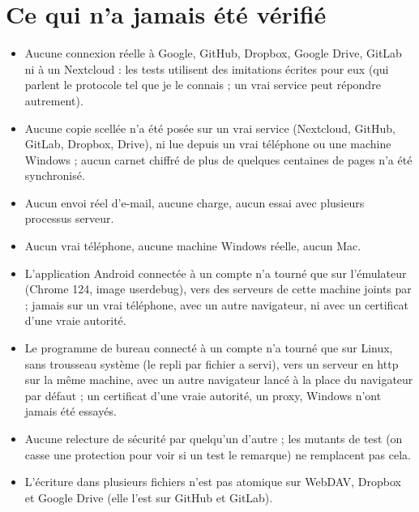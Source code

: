 \documentclass[10pt,a4paper]{article}
\newcommand{\code}[1]{\texttt{\detokenize{#1}}}
\begin{document}
\section{Ce qui n'a jamais été vérifié}\label{sec:nonverifie}
\begin{itemize}
\item Aucune connexion réelle à Google, GitHub, Dropbox, Google Drive, GitLab ni à un Nextcloud : les tests utilisent des imitations écrites pour eux (qui parlent le protocole tel que je le connais ; un vrai service peut répondre autrement).
\item Aucune copie scellée n'a été posée sur un vrai service (Nextcloud, GitHub, GitLab, Dropbox, Drive), ni lue depuis un vrai téléphone ou une machine Windows ; aucun carnet chiffré de plus de quelques centaines de pages n'a été synchronisé.
\item Aucun envoi réel d'e-mail, aucune charge, aucun essai avec plusieurs processus serveur.
\item Aucun vrai téléphone, aucune machine Windows réelle, aucun Mac.
\item L'application Android connectée à un compte n'a tourné que sur l'émulateur (Chrome 124, image userdebug), vers des serveurs de cette machine joints par \code{adb reverse} ; jamais sur un vrai téléphone, avec un autre navigateur, ni avec un certificat d'une vraie autorité.
\item Le programme de bureau connecté à un compte n'a tourné que sur Linux, sans trousseau système (le repli par fichier a servi), vers un serveur en http sur la même machine, avec un autre navigateur lancé à la place du navigateur par défaut ; un certificat d'une vraie autorité, un proxy, Windows n'ont jamais été essayés.
\item Aucune relecture de sécurité par quelqu'un d'autre ; les mutants de test (on casse une protection pour voir si un test le remarque) ne remplacent pas cela.
\item L'écriture dans plusieurs fichiers n'est pas atomique sur WebDAV, Dropbox et Google Drive (elle l'est sur GitHub et GitLab).
\end{itemize}
\end{document}
